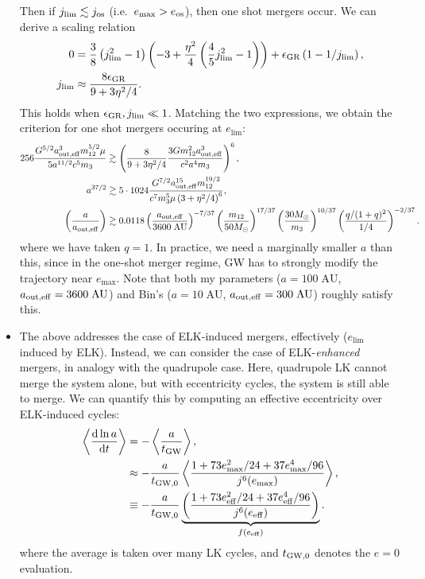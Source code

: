 \documentclass[11pt,
        usenames, %
        dvipsnames %
    ]{article}
\newcommand*{\rd}[2]{\frac{\mathrm{d}#1}{\mathrm{d}#2}}
\newcommand*{\ev}[1]{\left\langle#1\right\rangle}
\newcommand*{\p}[1]{\left(#1\right)}
\begin{document}
\begin{itemize}
        Then if $j_{\lim} \lesssim j_{\rm os}$ (i.e.\ $e_{\max} > e_{\rm os}$),
        then one shot mergers occur. We can derive a scaling relation
        \begin{align}
            0 &= \frac{3}{8}\p{j_{\lim}^2 - 1}\p{-3 + \frac{\eta^2}{4}
                \p{\frac{4}{5}j_{\lim}^2 - 1}} + \epsilon_{\rm GR}
                    \p{1 - 1/j_{\lim}},\\
            j_{\lim} &\approx \frac{8\epsilon_{\rm GR}}{9 + 3\eta^2/4}.
        \end{align}
        This holds when $\epsilon_{\rm GR}, j_{\lim} \ll 1$. Matching the two
        expressions, we obtain the criterion for one shot mergers occuring at
        $e_{\lim}$:
        \begin{align}
            256 \frac{G^{5/2}a_{\rm out, eff}^3 m_{12}^{5/2}\mu}{
                5a^{11/2}c^5 m_3}
                &\gtrsim \p{\frac{8}{9 + 3\eta^2/4}
                    \frac{3Gm_{12}^2a_{\rm out, eff}^3}{c^2a^4m_3}}^6,\\
            a^{37/2} &\gtrsim 5 \cdot 1024 \frac{G^{7/2}a_{\rm out, eff}^{15}
                m_{12}^{19/2}}{c^7 m_3^5 \mu \p{3 + \eta^2/4}^6},\\
            \p{\frac{a}{a_{\rm out, eff}}} &\gtrsim
                0.0118
                \p{\frac{a_{\rm out, eff}}{3600\;\mathrm{AU}}}^{-7/37}
                \p{\frac{m_{12}}{50M_{\odot}}}^{17/37}
                \p{\frac{30M_{\odot}}{m_3}}^{10/37}
                \p{\frac{q / (1 + q)^2}{1/4}}^{-2/37}.
        \end{align}
        where we have taken $q = 1$. In practice, we need a marginally smaller
        $a$ than this, since in the one-shot merger regime, GW has to strongly
        modify the trajectory near $e_{\max}$. Note that both my parameters ($a
        = 100\;\mathrm{AU}$, $a_{\rm out, eff} = 3600\;\mathrm{AU}$) and Bin's
        ($a = 10\;\mathrm{AU}$, $a_{\rm out, eff} = 300\;\mathrm{AU}$) roughly
        satisfy this.

    \item The above addresses the case of ELK-induced mergers, effectively
        ($e_{\lim}$ induced by ELK). Instead, we can consider the case of
        ELK-\emph{enhanced} mergers, in analogy with the quadrupole case. Here,
        quadrupole LK cannot merge the system alone, but with eccentricity
        cycles, the system is still able to merge. We can quantify this by
        computing an effective eccentricity over ELK-induced cycles:
        \begin{align}
            \ev{\rd{\ln a}{t}} &= -\ev{\frac{a}{t_{\rm GW}}},\\
                &\approx -\frac{a}{t_{\rm GW, 0}}
                    \ev{\frac{1 + 73e_{\max}^2/24 + 37e_{\max}^4/96}
                        {j^6(e_{\max})}},\\
                &\equiv -\frac{a}{t_{\rm GW,0}}
                    \underbrace{\p{\frac{1 + 73e_{\rm eff}^2/24 + 37e_{\rm
                    eff}^4/96}{j^6(e_{\rm eff})}}}_{f\p{e_{\rm eff}}}.
        \end{align}
        where the average is taken over many LK cycles, and $t_{\rm GW, 0}$
        denotes the $e = 0$ evaluation.


\end{itemize}
\end{document}
